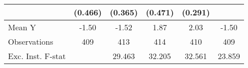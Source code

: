 {\begin{tabular}{l*{5}{c}}
            &     (0.466)         &     (0.365)         &     (0.471)         &     (0.291)         &                     \\
\midrule
Mean Y      &       -1.50         &       -1.52         &        1.87         &        2.03         &       -1.50         \\
Observations&         409         &         413         &         414         &         410         &         409         \\
Exc. Inst. F-stat&                     &      29.463         &      32.205         &      32.561         &      23.859         \\
\bottomrule
\end{tabular}
}
